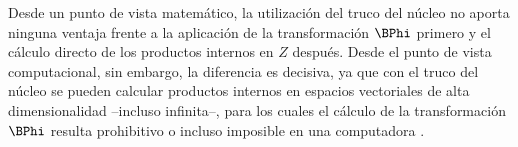 Desde un punto de vista matemático, la utilización del truco del
núcleo no aporta ninguna ventaja frente a la aplicación de la
transformación $\BPhi$ primero y el cálculo directo de los productos
internos en $Z$ después.
Desde el punto de vista computacional, sin embargo, la diferencia es
decisiva, ya que con el truco del núcleo se pueden calcular productos
internos en espacios vectoriales de alta dimensionalidad --incluso
infinita--, para los cuales el cálculo de la transformación $\BPhi$
resulta prohibitivo o incluso imposible en una computadora
\cite{glasmachers}.
%
